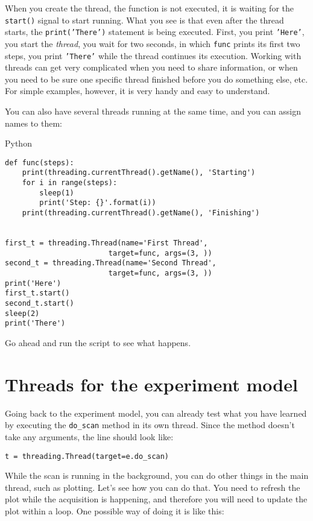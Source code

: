When you create the thread, the function is not executed, it is waiting
for the \texttt{start()} signal to start running. What you see is that
even after the thread starts, the
\texttt{print('There')} statement is
being executed. First, you print
\texttt{'Here'}, you start the
\emph{thread}, you wait for two seconds, in which \texttt{func} prints
its first two steps, you print
\texttt{'There'} while the thread
continues its execution. Working with threads can get very complicated
when you need to share information, or when you need to be sure one
specific thread finished before you do something else, etc. For simple
examples, however, it is very handy and easy to understand.

You can also have several threads running at the same time, and you can
assign names to them:

Python

\begin{verbatim}
def func(steps):
    print(threading.currentThread().getName(), 'Starting')
    for i in range(steps):
        sleep(1)
        print('Step: {}'.format(i))
    print(threading.currentThread().getName(), 'Finishing')


first_t = threading.Thread(name='First Thread', 
                        target=func, args=(3, ))
second_t = threading.Thread(name='Second Thread', 
                        target=func, args=(3, ))
print('Here')
first_t.start()
second_t.start()
sleep(2)
print('There')
\end{verbatim}

Go ahead and run the script to see what happens.

\section{Threads for the experiment model}\label{threads-for-the-experimentmodel}

Going back to the experiment model, you can already test what you have
learned by executing the \texttt{do_scan} method in its own thread.
Since the method doesn't take any arguments, the line should look like:

\begin{verbatim}
t = threading.Thread(target=e.do_scan)
\end{verbatim}

While the scan is running in the background, you can do other things in
the main thread, such as plotting. Let's see how you can do that. You
need to refresh the plot while the acquisition is happening, and
therefore you will need to update the plot within a loop. One possible
way of doing it is like this:

